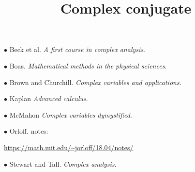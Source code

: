 \documentclass[11pt, oneside]{article}
\title{Complex conjugate}
\date{}
\begin{document}
\maketitle
\Large


$\bullet$ Beck et al.  \emph{A first course in complex analysis}.

$\bullet$ Boas.  \emph{Mathematical methods in the physical sciences}.

$\bullet$ Brown and Churchill.  \emph{Complex variables and applications}.

$\bullet$ Kaplan  \emph{Advanced calculus}.

$\bullet$ McMahon  \emph{Complex variables dymystified}.

$\bullet$ Orloff.  notes:

\url{https://math.mit.edu/~jorloff/18.04/notes/}

$\bullet$ Stewart and Tall.  \emph{Complex analysis}.
\end{document}
